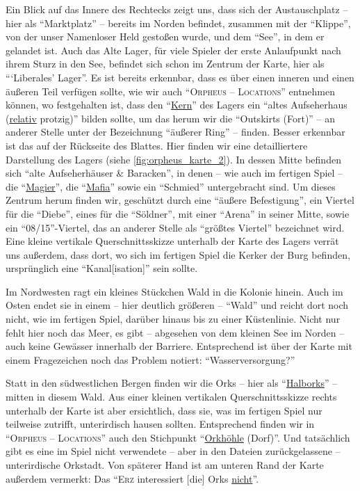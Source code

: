 \documentclass[a5paper,pagesize,numbers=noenddot]{scrbook}
\begin{document}
Ein Blick auf das Innere des Rechtecks zeigt uns, dass sich der Austauschplatz -- hier als \enquote{Marktplatz} -- bereits im Norden befindet, zusammen mit der \enquote{Klippe}, von der unser Namenloser Held gestoßen wurde, und dem \enquote{See}, in dem er gelandet ist.
Auch das Alte Lager, für viele Spieler der erste Anlaufpunkt nach ihrem Sturz in den See, befindet sich schon im Zentrum der Karte, hier als \enquote{\enquote{Liberales} Lager}.
Es ist bereits erkennbar, dass es über einen inneren und einen äußeren Teil verfügen sollte, wie wir auch \enquote{\textsc{Orpheus -- Locations}} entnehmen können, wo festgehalten ist, dass den \enquote{\uline{Kern}} des Lagers ein \enquote{altes Aufseherhaus (\uline{relativ} protzig)} bilden sollte, um das herum wir die \enquote{Outskirts (Fort)} -- an anderer Stelle unter der Bezeichnung \enquote{äußerer Ring}\autocite[S.~19]{orpheus_b_scribbles} -- finden.
Besser erkennbar ist das auf der Rückseite des Blattes.
Hier finden wir eine detailliertere Darstellung des Lagers (siehe \autoref{fig:orpheus_karte_2}).
In dessen Mitte befinden sich \enquote{alte Aufseherhäuser \& Baracken}, in denen -- wie auch im fertigen Spiel -- die \enquote{\uline{Magier}}, die \enquote{\uline{Mafia}} sowie ein \enquote{Schmied} untergebracht sind.
Um dieses Zentrum herum finden wir, geschützt durch eine \enquote{äußere Befestigung}, ein Viertel für die \enquote{Diebe}, eines für die \enquote{Söldner}, mit einer \enquote{Arena} in seiner Mitte, sowie ein \enquote{08/15}-Viertel, das an anderer Stelle als \enquote{größtes Viertel}\autocite[S.~14]{orpheus_b_scribbles} bezeichnet wird.
Eine kleine vertikale Querschnittsskizze unterhalb der Karte des Lagers verrät uns außerdem, dass dort, wo sich im fertigen Spiel die Kerker der Burg befinden, ursprünglich eine \enquote{Kanal[isation]} sein sollte.

Im Nordwesten ragt ein kleines Stückchen Wald in die Kolonie hinein.
Auch im Osten endet sie in einem -- hier deutlich größeren -- \enquote{Wald} und reicht dort noch nicht, wie im fertigen Spiel, darüber hinaus bis zu einer Küstenlinie.
Nicht nur fehlt hier noch das Meer, es gibt -- abgesehen von dem kleinen See im Norden -- auch keine Gewässer innerhalb der Barriere.
Entsprechend ist über der Karte mit einem Fragezeichen noch das Problem notiert:
\enquote{Wasserversorgung?}

Statt in den südwestlichen Bergen finden wir die Orks -- hier als \enquote{\uline{Halborks}} -- mitten in diesem Wald.
Aus einer kleinen vertikalen Querschnittsskizze rechts unterhalb der Karte ist aber ersichtlich, dass sie, was im fertigen Spiel nur teilweise zutrifft, unterirdisch hausen sollten.
Entsprechend finden wir in \enquote{\textsc{Orpheus -- Locations}} auch den Stichpunkt \enquote{\uline{Orkhöhle} (Dorf)}.
Und tatsächlich gibt es eine im Spiel nicht verwendete -- aber in den Dateien zurückgelassene -- unterirdische Orkstadt.\autocite[Vgl.][]{wog_level_2023}
Von späterer Hand ist am unteren Rand der Karte außerdem vermerkt: Das \enquote{\textsc{Erz} interessiert [die] Orks \uline{nicht}}.
\end{document}
